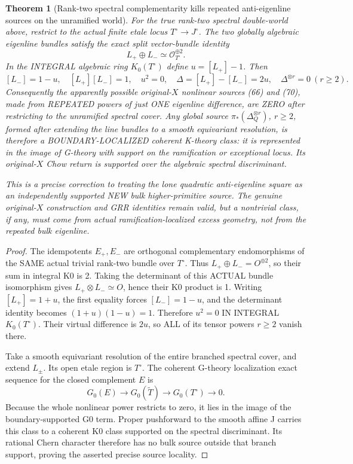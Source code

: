 \documentclass[11pt]{article}
\newtheorem{theorem}{Theorem}[section]
\begin{document}
\begin{theorem}[Rank-two spectral complementarity kills repeated anti-eigenline sources on the unramified world]
For the true rank-two spectral
double-world above, restrict to
the actual finite etale locus
$T^\circ\to J^\circ$.
The two globally algebraic
eigenline bundles satisfy the
exact split vector-bundle identity
\[
  L_+\oplus L_-
       \simeq\mathcal O_{T^\circ}^{\oplus2}.
\]
In the INTEGRAL algebraic ring
$K_0(T^\circ)$ define
$u=[L_+]-1$. Then
\[
 \boxed{
 [L_-]=1-u,\quad
 [L_+][L_-]=1,\quad
 u^2=0,\quad
 \Delta=[L_+]-[L_-]=2u,\quad
 \Delta^{\otimes r}=0\ (r\ge2).
 }                                               \tag{71}
\]
Consequently the apparently
possible original-$X$ nonlinear
sources (66) and (70), made
from REPEATED powers of just
ONE eigenline difference, are
ZERO after restricting to
the unramified spectral cover.
Any global source
$\pi_*(\Delta_Q^{\otimes r})$,
$r\ge2$, formed after
extending the line bundles to
a smooth equivariant
resolution, is therefore a
BOUNDARY-LOCALIZED coherent
K-theory class: it is represented
in the image of G-theory with
support on the ramification or
exceptional locus.
Its original-$X$ Chow return
is supported over the algebraic
spectral discriminant.

This is a precise correction to
treating the lone quadratic
anti-eigenline square as an
independently supported NEW
bulk higher-primitive source.
The genuine original-$X$
construction and GRR identities
remain valid, but a nontrivial
class, if any, must come from
actual ramification-localized
excess geometry, not from the
repeated bulk eigenline.
\end{theorem}
\begin{proof}
The idempotents $E_+,E_-$
are orthogonal complementary
endomorphisms of the SAME
actual trivial rank-two
bundle over $T^\circ$.
Thus $L_+\oplus L_-=
O^{\oplus2}$, so their
sum in integral K0 is 2.
Taking the determinant of
this ACTUAL bundle
isomorphism gives
$L_+\otimes L_-\simeq O$,
hence their K0 product is 1.
Writing $[L_+]=1+u$,
the first equality forces
$[L_-]=1-u$, and the
determinant identity becomes
$(1+u)(1-u)=1$.
Therefore $u^2=0$
IN INTEGRAL $K_0(T^\circ)$.
Their virtual difference is
$2u$, so ALL of its tensor
powers $r\ge2$ vanish there.

Take a smooth equivariant
resolution of the entire
branched spectral cover,
and extend $L_\pm$.
Its open etale region is
$T^\circ$. The coherent
G-theory localization exact
sequence for the closed
complement $E$ is
\[
 G_0(E)\longrightarrow
 G_0(\widetilde T)
 \longrightarrow G_0(T^\circ)
 \longrightarrow0 .
\]
Because the whole nonlinear
power restricts to zero, it
lies in the image of the
boundary-supported G0 term.
Proper pushforward to
the smooth affine J carries
this class to a coherent
K0 class supported on the
spectral discriminant.
Its rational Chern character
therefore has no bulk source
outside that branch support,
proving the asserted precise
source locality.
\end{proof}
\end{document}

